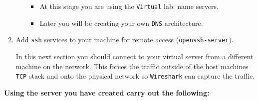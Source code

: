 \documentclass[11pt]{article}
\begin{document}
\begin{enumerate}
\begin{itemize}
\begin{tcolorbox}[title={\textbf{Notes:}}]
                    \begin{itemize}
                        \item At this stage you are using the \texttt{Virtual} lab. name servers.
                        \item Later you will be creating your own \texttt{DNS} architecture.
                    \end{itemize}
                \end{tcolorbox}
        \end{itemize}
    \item Add \texttt{ssh} services to your machine for remote access (\texttt{openssh-server}).
        \begin{tcolorbox}[title={\textbf{Note:}}]
            In this next section you should connect to your virtual server from a different machine on the network. This forces the traffic outside of the host machines \texttt{TCP} stack and onto the physical network so \texttt{Wireshark} can capture the traffic.
        \end{tcolorbox}
    \end{enumerate}
    \noindent \textbf{Using the server you have created carry out the following:}
\end{document}
